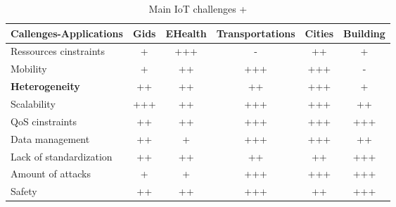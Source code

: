 \begin{table}[h!]
\scriptsize
	\begin{tabulary}{\textwidth}{L|C|C|C|C|C}
	Callenges-Applications  & Gids & EHealth & Transportations & Cities & \textbf{Building}\\\hline
	Ressources cinstraints  & +           & +++     & -               & ++           & +            \\\hline
	Mobility                & +           & ++      & +++             & +++          & -            \\\hline
	\textbf{Heterogeneity}  & ++          & ++      & ++              & +++          & +            \\\hline
	Scalability             & +++         & ++      & +++             & +++          & ++           \\\hline
	QoS cinstraints         & ++          & ++      & +++             & +++          & +++          \\\hline
	Data management         & ++          & +       & +++             & +++          & ++           \\\hline
	Lack of standardization & ++          & ++      & ++              & ++           & +++          \\\hline
	Amount of attacks       & +           & +       & +++             & +++          & +++          \\\hline
	Safety                  & ++          & ++      & +++             & ++           & +++          \\\hline
	\end{tabulary}
\caption{\label{tab:iot_challenges} Main IoT challenges\cite{kouicem_internet_2018} + \cite{venkatesan_design_2017}}
\end{table}


